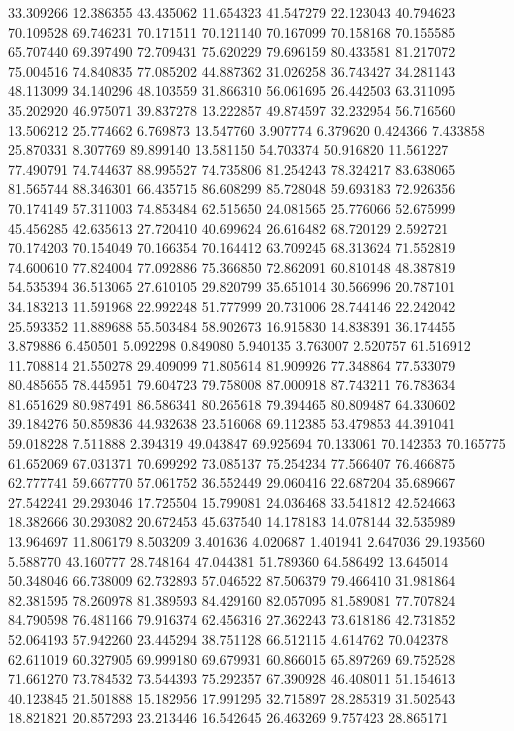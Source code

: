 33.309266
12.386355
43.435062
11.654323
41.547279
22.123043
40.794623
70.109528
69.746231
70.171511
70.121140
70.167099
70.158168
70.155585
65.707440
69.397490
72.709431
75.620229
79.696159
80.433581
81.217072
75.004516
74.840835
77.085202
44.887362
31.026258
36.743427
34.281143
48.113099
34.140296
48.103559
31.866310
56.061695
26.442503
63.311095
35.202920
46.975071
39.837278
13.222857
49.874597
32.232954
56.716560
13.506212
25.774662
6.769873
13.547760
3.907774
6.379620
0.424366
7.433858
25.870331
8.307769
89.899140
13.581150
54.703374
50.916820
11.561227
77.490791
74.744637
88.995527
74.735806
81.254243
78.324217
83.638065
81.565744
88.346301
66.435715
86.608299
85.728048
59.693183
72.926356
70.174149
57.311003
74.853484
62.515650
24.081565
25.776066
52.675999
45.456285
42.635613
27.720410
40.699624
26.616482
68.720129
2.592721
70.174203
70.154049
70.166354
70.164412
63.709245
68.313624
71.552819
74.600610
77.824004
77.092886
75.366850
72.862091
60.810148
48.387819
54.535394
36.513065
27.610105
29.820799
35.651014
30.566996
20.787101
34.183213
11.591968
22.992248
51.777999
20.731006
28.744146
22.242042
25.593352
11.889688
55.503484
58.902673
16.915830
14.838391
36.174455
3.879886
6.450501
5.092298
0.849080
5.940135
3.763007
2.520757
61.516912
11.708814
21.550278
29.409099
71.805614
81.909926
77.348864
77.533079
80.485655
78.445951
79.604723
79.758008
87.000918
87.743211
76.783634
81.651629
80.987491
86.586341
80.265618
79.394465
80.809487
64.330602
39.184276
50.859836
44.932638
23.516068
69.112385
53.479853
44.391041
59.018228
7.511888
2.394319
49.043847
69.925694
70.133061
70.142353
70.165775
61.652069
67.031371
70.699292
73.085137
75.254234
77.566407
76.466875
62.777741
59.667770
57.061752
36.552449
29.060416
22.687204
35.689667
27.542241
29.293046
17.725504
15.799081
24.036468
33.541812
42.524663
18.382666
30.293082
20.672453
45.637540
14.178183
14.078144
32.535989
13.964697
11.806179
8.503209
3.401636
4.020687
1.401941
2.647036
29.193560
5.588770
43.160777
28.748164
47.044381
51.789360
64.586492
13.645014
50.348046
66.738009
62.732893
57.046522
87.506379
79.466410
31.981864
82.381595
78.260978
81.389593
84.429160
82.057095
81.589081
77.707824
84.790598
76.481166
79.916374
62.456316
27.362243
73.618186
42.731852
52.064193
57.942260
23.445294
38.751128
66.512115
4.614762
70.042378
62.611019
60.327905
69.999180
69.679931
60.866015
65.897269
69.752528
71.661270
73.784532
73.544393
75.292357
67.390928
46.408011
51.154613
40.123845
21.501888
15.182956
17.991295
32.715897
28.285319
31.502543
18.821821
20.857293
23.213446
16.542645
26.463269
9.757423
28.865171
